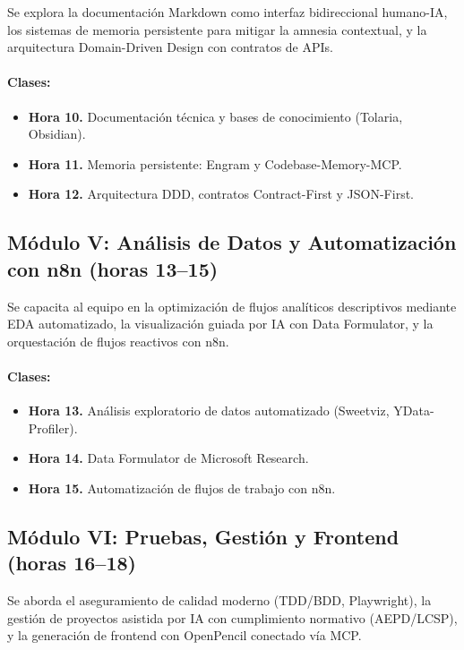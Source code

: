 \documentclass[11pt,a4paper]{article}
\begin{document}
Se explora la documentación Markdown como interfaz bidireccional humano-IA, los sistemas de memoria persistente para mitigar la amnesia contextual, y la arquitectura Domain-Driven Design con contratos de APIs.

\paragraph{Clases:}
\begin{itemize}
  \item \textbf{Hora 10.} Documentación técnica y bases de conocimiento (Tolaria, Obsidian).
  \item \textbf{Hora 11.} Memoria persistente: Engram y Codebase-Memory-MCP.
  \item \textbf{Hora 12.} Arquitectura DDD, contratos Contract-First y JSON-First.
\end{itemize}

\subsection{Módulo V: Análisis de Datos y Automatización con n8n (horas 13--15)}

Se capacita al equipo en la optimización de flujos analíticos descriptivos mediante EDA automatizado, la visualización guiada por IA con Data Formulator, y la orquestación de flujos reactivos con n8n.

\paragraph{Clases:}
\begin{itemize}
  \item \textbf{Hora 13.} Análisis exploratorio de datos automatizado (Sweetviz, YData-Profiler).
  \item \textbf{Hora 14.} Data Formulator de Microsoft Research.
  \item \textbf{Hora 15.} Automatización de flujos de trabajo con n8n.
\end{itemize}

\subsection{Módulo VI: Pruebas, Gestión y Frontend (horas 16--18)}

Se aborda el aseguramiento de calidad moderno (TDD/BDD, Playwright), la gestión de proyectos asistida por IA con cumplimiento normativo (AEPD/LCSP), y la generación de frontend con OpenPencil conectado vía MCP.
\end{document}
